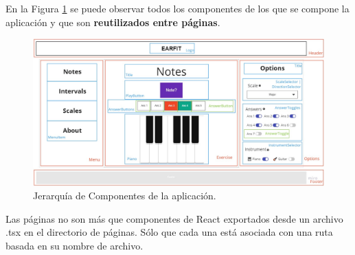 \documentclass[12pt,twoside,titlepage]{report}
\begin{document}
En la Figura \ref{fig:JerarquiaComponentes} se puede observar todos los componentes de los que se compone la aplicación y que son \textbf{reutilizados entre páginas}.

\begin{figure}[H]
    \centering
    \includegraphics[width=\textwidth]{Detalles de Implementación/JerarquíaComponentes}
    \caption{Jerarquía de Componentes de la aplicación.}
    \label{fig:JerarquiaComponentes}
\end{figure}

Las páginas no son más que componentes de React exportados desde un archivo .tsx en el directorio de páginas. Sólo que cada una está asociada con una ruta basada en su nombre de archivo.

\end{document}

